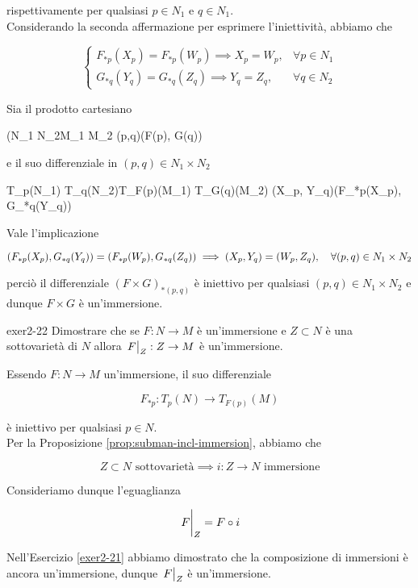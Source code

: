 {rispettivamente per qualsiasi $ p \in N_{1} $ e $ q \in N_{1} $. \\
Considerando la seconda affermazione per esprimere l'iniettività, abbiamo che

\begin{equation}
	\begin{cases}
		F_{*p}(X_{p}) = F_{*p}(W_{p}) \implies X_{p} = W_{p}, & \forall p \in N_{1} \\
		G_{*q}(Y_{q}) = G_{*q}(Z_{q}) \implies Y_{q} = Z_{q}, & \forall q \in N_{2}
	\end{cases}
\end{equation}

Sia il prodotto cartesiano

	{(N_{1} \times N_{2}}{M_{1} \times M_{2}}
	{(p,q)}{(F(p), G(q))}

e il suo differenziale in $ (p,q) \in N_{1} \times N_{2} $

	{T_{p}(N_{1}) \times T_{q}(N_{2})}{T_{F(p)}(M_{1}) \times T_{G(q)}(M_{2})}
	{(X_{p}, Y_{q})}{(F_{*p}(X_{p}), G_{*q}(Y_{q}))}

Vale l'implicazione

\begin{equation}
	(F_{*p}(X_{p}), G_{*q}(Y_{q})) = (F_{*p}(W_{p}), G_{*q}(Z_{q})) %
	\implies %
	(X_{p}, Y_{q}) = (W_{p}, Z_{q}) %
	\qcomma \forall (p,q) \in N_{1} \times N_{2}
\end{equation}

perciò il differenziale $ (F \times G)_{*(p,q)} $ è iniettivo per qualsiasi $ (p,q) \in N_{1} \times N_{2} $ e dunque $ F \times G $ è un'immersione.
}


{exer2-22}
{
Dimostrare che se $ F : N \to M $ è un'immersione e $ Z \subset N $ è una sottovarietà di $ N $ allora $ \eval{F}_{Z} : Z \to M $ è un'immersione.
}
{
Essendo $ F : N \to M $ un'immersione, il suo differenziale

\begin{equation}
	F_{*p} : T_{p}(N) \to T_{F(p)}(M)
\end{equation}

è iniettivo per qualsiasi $ p \in N $. \\
Per la Proposizione \ref{prop:subman-incl-immersion}, abbiamo che

\begin{equation}
	Z \subset N \text{ sottovarietà} %
	\implies %
	i : Z \to N \text{ immersione}
\end{equation}

Consideriamo dunque l'eguaglianza

\begin{equation}
	\eval{F}_{Z} = F \circ i
\end{equation}

Nell'Esercizio \ref{exer2-21} abbiamo dimostrato che la composizione di immersioni è ancora un'immersione, dunque $ \eval{F}_{Z} $ è un'immersione.
}

